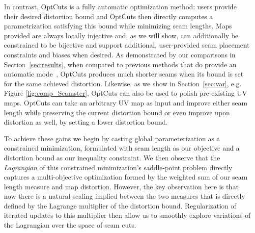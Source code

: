 In contrast, OptCuts is a fully automatic optimization method: users provide their desired distortion bound and OptCuts then directly computes a parametrization satisfying this bound while minimizing seam lengths.  Maps provided are always locally injective and, as we will show, can additionally be constrained to be bijective and support additional, user-provided seam placement constraints and biases when desired. %
As demonstrated by our comparisons in Section~\ref{sec:results},
when compared to previous methods that do provide an automatic mode~\cite{BoundedDistortParam:2002,Poranne2017Autocuts}, OptCuts produces much shorter seams when its bound is set for the same achieved distortion. 
Likewise, as we show in Section~\ref{sec:var}, e.g. Figure \ref{fig:comp_Seamster}, OptCuts can also be used to polish pre-existing UV maps. 
OptCuts can take an arbitrary UV map as input and improve either seam length while preserving the current distortion bound or even improve upon distortion as well, by setting a lower distortion bound.

  To achieve these gains we begin by casting global parameterization as a constrained minimization, formulated with seam length as our objective and a distortion bound as our inequality constraint. We then observe that the \emph{Lagrangian} of this constrained minimization's saddle-point problem directly captures a multi-objective optimization formed by the weighted sum of our seam length measure and map distortion. However, the key observation here is that now there is a natural scaling implied between the two measures that is directly defined by the Lagrange multiplier of the distortion bound. Regularization of iterated updates to this multiplier then allow us to smoothly explore variations of the Lagrangian over the space of seam cuts. 
  
